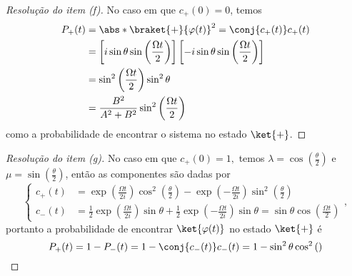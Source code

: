 \begin{proof}[Resolução do item (f)]
    No caso em que \(c_+(0) = 0\), temos
    \begin{align*}
        P_+(t) &= \abs*{\braket{+}{\varphi(t)}}^2 = \conj{c_+(t)}c_+(t)\\
               &= \left[i\sin\theta\sin\left(\frac{\Omega t}{2}\right)\right]\left[-i\sin\theta\sin\left(\frac{\Omega t}{2}\right)\right]\\
               &= \sin^2\left(\frac{\Omega t}{2}\right) \sin^2\theta\\
               &= \frac{B^2}{A^2 + B^2}\sin^2\left(\frac{\Omega t}{2}\right)
    \end{align*}
    como a probabilidade de encontrar o sistema no estado \(\ket{+}\).
\end{proof}
\begin{proof}[Resolução do item (g)]
    No caso em que \(c_+(0) = 1,\) temos \(\lambda = \cos\left(\frac{\theta}{2}\right)\) e \(\mu = \sin\left(\frac\theta2\right)\), então as componentes são dadas por
    \begin{equation*}
        \left\{
        \begin{aligned}
            c_+(t) &= \exp\left(\frac{\Omega t}{2i}\right)\cos^2\left(\frac\theta2\right) - \exp\left(-\frac{\Omega t}{2i}\right)\sin^2\left(\frac\theta2\right)\\
            c_-(t) &= \frac12\exp\left(\frac{\Omega t}{2i}\right)\sin\theta + \frac12\exp\left(-\frac{\Omega t}{2i}\right)\sin\theta = \sin\theta \cos\left(\frac{\Omega t}{2}\right)
        \end{aligned}\right.,
    \end{equation*}
    portanto a probabilidade de encontrar \(\ket{\varphi(t)}\) no estado \(\ket{+}\) é
    \begin{equation*}
        P_+(t) = 1 - P_-(t) = 1 - \conj{c_-(t)}c_-(t) = 1 - \sin^2\theta \cos^2\left(\right)
    \end{equation*}


\end{proof}
